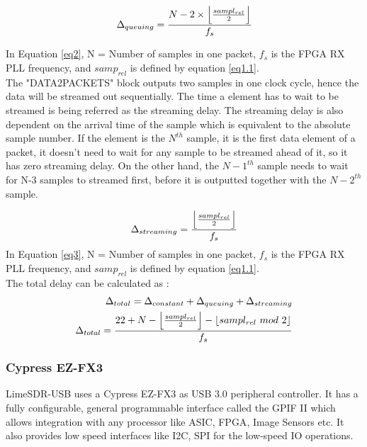 \begin{equation} \label{eq2}
\Delta_{queuing} = \frac{N - 2 \times \floor*{\frac{sampl_{rel}}{2}}}{f_s}
\end{equation}

In Equation \ref{eq2}, N = Number of samples in one packet, $f_s$ is the \ac{FPGA} RX PLL frequency, and $samp_{rel}$ is defined by equation \ref{eq1.1}. \\

The "DATA2PACKETS" block outputs two samples in one clock cycle, hence the data will be streamed out sequentially.
The time a element has to wait to be streamed is being referred as the streaming delay.
The streaming delay is also dependent on the arrival time of the sample which is equivalent to the absolute sample number.
If the element is the $N^{th}$ sample, it is the first data element of a packet, it doesn't need to wait for any sample to be streamed ahead of it, so it has zero streaming delay.
On the other hand, the $N-1^{th}$ sample needs to wait for N-3 samples to streamed first, before it is outputted together with the $N-2^{th}$ sample.

\begin{equation}\label{eq3}
\Delta_{streaming} =\frac{\floor*{\frac{sampl_{rel}}{2}}}{f_s}
\end{equation} 
In Equation \ref{eq3}, N = Number of samples in one packet,  $f_s$ is the \ac{FPGA} RX PLL frequency, and $samp_{rel}$ is defined by equation \ref{eq1.1}. \\

The total delay can be calculated as :\\
\begin{subequations}\label{eq4}
\begin{align}
\Delta_{total}= \Delta_{constant} + \Delta_{queuing} + \Delta_{streaming} \\
\Delta_{total}= \frac{22 +  N - \floor*{\frac{sampl_{rel}}{2}} - \floor*{sampl_{rel} \ mod \ 2}}{f_s}
\end{align}
\end{subequations}



\subsubsection{Cypress EZ-FX3}
LimeSDR-USB uses a Cypress EZ-FX3 as \ac{USB} 3.0 peripheral controller.
It has a fully configurable, general programmable interface called the \ac{GPIF} II which allows integration with any processor like \ac{ASIC}, \ac{FPGA}, Image Sensors etc.
It also provides low speed interfaces like \ac{I2C}, \ac{SPI} for the low-speed \ac{IO} operations.\\

